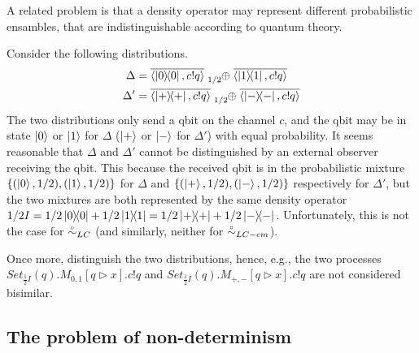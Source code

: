 A related problem is that a density operator may represent different probabilistic ensambles, that are indistinguishable according to quantum theory.
\begin{example}
	Consider the following distributions.
	\begin{align*}
		\Delta &= \overline{\confw{\ketbra{0}{0}, c!q}} \psum{1/2} \overline{\confw{\ketbra{1}{1}, c!q}}\\
		\Delta' &= \overline{\confw{\ketbra{+}{+}, c!q}} \psum{1/2} \overline{\confw{\ketbra{-}{-}, c!q}}
	\end{align*}
	The two distributions only send a qbit on the channel $c$, and the qbit may be in state $\ket{0}$ or $\ket{1}$ for $\Delta$ ($\ket{+}$ or $\ket{-}$ for $\Delta'$) with equal probability.
	It seems reasonable that $\Delta$ and $\Delta'$ cannot be distinguished by an external observer receiving the qbit.
	This because the received qbit is in the probabilistic mixture $\{(\ket{0}, 1/2), (\ket{1}, 1/2)\}$ for $\Delta$ and $\{(\ket{+}, 1/2), (\ket{-}, 1/2)\}$ respectively for $\Delta'$, but the two mixtures are both represented by the same density operator $1/2 I = 1/2 \ketbra{0}{0} + 1/2 \ketbra{1}{1} = 1/2 \ketbra{+}{+} + 1/2 \ketbra{-}{-}$.
	Unfortunately, this is not the case for $\stackrel{\scriptscriptstyle \circ}{\sim}_{LC}$ (and similarly, neither for $\stackrel{\scriptscriptstyle \circ}{\sim}_{LC-cm}$).
\end{example}
Once more, \cite{Feng:2012, Deng:2012} distinguish the two distributions, hence, e.g., the two processes $Set_{\frac{1}{2} I}(q).M_{0,1}[q \triangleright x].c!q$ and $Set_{\frac{1}{2} I}(q).M_{+,-}[q \triangleright x].c!q$ are not considered bisimilar.

\subsection{The problem of non-determinism}

